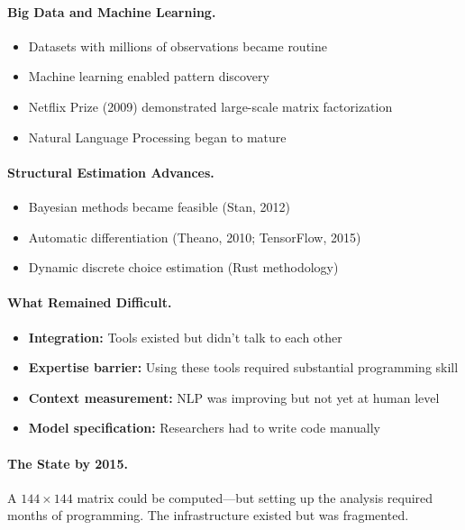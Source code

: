 \paragraph{Big Data and Machine Learning.}
\begin{itemize}
  \item Datasets with millions of observations became routine
  \item Machine learning enabled pattern discovery
  \item Netflix Prize (2009) demonstrated large-scale matrix factorization
  \item Natural Language Processing began to mature
\end{itemize}

\paragraph{Structural Estimation Advances.}
\begin{itemize}
  \item Bayesian methods became feasible (Stan, 2012)
  \item Automatic differentiation (Theano, 2010; TensorFlow, 2015)
  \item Dynamic discrete choice estimation (Rust methodology)
\end{itemize}

\paragraph{What Remained Difficult.}
\begin{itemize}
  \item \textbf{Integration:} Tools existed but didn't talk to each other
  \item \textbf{Expertise barrier:} Using these tools required substantial programming skill
  \item \textbf{Context measurement:} NLP was improving but not yet at human level
  \item \textbf{Model specification:} Researchers had to write code manually
\end{itemize}

\paragraph{The State by 2015.}
A $144 \times 144$ matrix could be computed---but setting up the analysis
required months of programming. The infrastructure existed but was fragmented.

